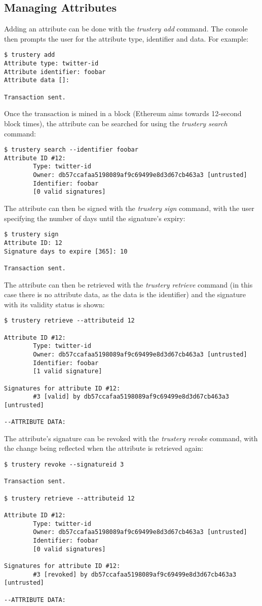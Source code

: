 \documentclass[12pt]{report}
\begin{document}
	\subsection{Managing Attributes}
	Adding an attribute can be done with the \textit{trustery add} command. The console then prompts the user for the attribute type, identifier and data. For example:
	\begin{lstlisting}
$ trustery add
Attribute type: twitter-id
Attribute identifier: foobar
Attribute data []: 

Transaction sent.
	\end{lstlisting}
	Once the transaction is mined in a block (Ethereum aims towards 12-second block times\cite{23}), the attribute can be searched for using the \textit{trustery search} command:
	\begin{lstlisting}
$ trustery search --identifier foobar
Attribute ID #12:
        Type: twitter-id
        Owner: db57ccafaa5198089af9c69499e8d3d67cb463a3 [untrusted]
        Identifier: foobar
        [0 valid signatures]
	\end{lstlisting}
	The attribute can then be signed with the \textit{trustery sign} command, with the user specifying the number of days until the signature's expiry:
	\begin{lstlisting}
$ trustery sign
Attribute ID: 12
Signature days to expire [365]: 10

Transaction sent.
	\end{lstlisting}
	The attribute can then be retrieved with the \textit{trustery retrieve} command (in this case there is no attribute data, as the data is the identifier) and the signature with its validity status is shown:
	\begin{lstlisting}
$ trustery retrieve --attributeid 12

Attribute ID #12:
        Type: twitter-id
        Owner: db57ccafaa5198089af9c69499e8d3d67cb463a3 [untrusted]
        Identifier: foobar
        [1 valid signature]

Signatures for attribute ID #12:
        #3 [valid] by db57ccafaa5198089af9c69499e8d3d67cb463a3 [untrusted]

--ATTRIBUTE DATA:

	\end{lstlisting}
	The attribute's signature can be revoked with the \textit{trustery revoke} command, with the change being reflected when the attribute is retrieved again:
	\begin{lstlisting}
$ trustery revoke --signatureid 3

Transaction sent.

$ trustery retrieve --attributeid 12

Attribute ID #12:
        Type: twitter-id
        Owner: db57ccafaa5198089af9c69499e8d3d67cb463a3 [untrusted]
        Identifier: foobar
        [0 valid signatures]

Signatures for attribute ID #12:
        #3 [revoked] by db57ccafaa5198089af9c69499e8d3d67cb463a3 [untrusted]

--ATTRIBUTE DATA:

	\end{lstlisting}
	
\end{document}
